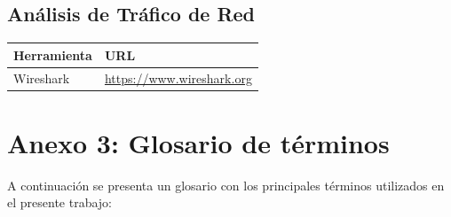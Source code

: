 \documentclass[a4paper, 11pt]{article}
\begin{document}
\subsection*{Análisis de Tráfico de Red}
\begin{table}[H]
\centering
\begin{tabular}{|m{5cm}|m{10cm}|}
\hline
\textbf{Herramienta} & \textbf{URL} \\
\hline
Wireshark & \url{https://www.wireshark.org} \\
\hline
\end{tabular}
\end{table}


\clearpage
\thispagestyle{nohead}

\section*{Anexo 3: Glosario de términos}
\label{anexo:3}

A continuación se presenta un glosario con los principales términos utilizados en el presente trabajo:
\end{document}
